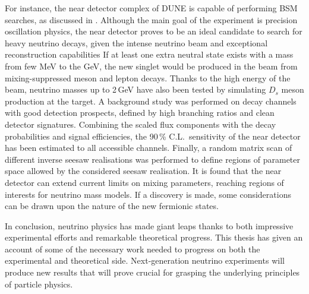 For instance, the near detector complex of DUNE is capable of performing BSM searches, %
as discussed in .
Although the main goal of the experiment is precision oscillation physics, %
the near detector proves to be an ideal candidate to search for heavy neutrino decays, %
given the intense neutrino beam and exceptional reconstruction capabilities 
If at least one extra neutral state exists with a mass from few MeV to the GeV, %
the new singlet would be produced in the beam from mixing-suppressed meson and lepton decays.
Thanks to the high energy of the beam, neutrino masses up to 2\,GeV have also been tested %
by simulating $D_s$ meson production at the target.
A background study was performed on decay channels with good detection prospects, %
defined by high branching ratios and clean detector signatures.
Combining the scaled flux components with the decay probabilities and signal efficiencies, %
the 90\,\% C.L.\ sensitivity of the near detector has been estimated to all accessible channels.
Finally, a random matrix scan of different inverse seesaw realisations was performed %
to define regions of parameter space allowed by the considered seesaw realisation.
It is found that the near detector can extend current limits on mixing parameters, %
reaching regions of interests for neutrino mass models.
If a discovery is made, some considerations can be drawn upon the nature of the new fermionic states.


In conclusion, neutrino physics has made giant leaps thanks to both impressive experimental efforts %
and remarkable theoretical progress.
This thesis has given an account of some of the necessary work needed to progress on both %
the experimental and theoretical side.
Next-generation neutrino experiments will produce new results that will prove crucial for grasping the underlying %
principles of particle physics.
